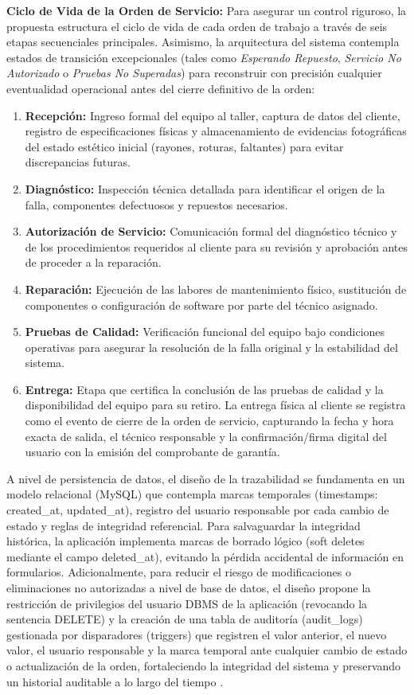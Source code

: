 \textbf{Ciclo de Vida de la Orden de Servicio:} Para asegurar un control riguroso, la propuesta estructura el ciclo de vida de cada orden de trabajo a través de seis etapas secuenciales principales. Asimismo, la arquitectura del sistema contempla estados de transición excepcionales (tales como \textit{Esperando Repuesto}, \textit{Servicio No Autorizado} o \textit{Pruebas No Superadas}) para reconstruir con precisión cualquier eventualidad operacional antes del cierre definitivo de la orden:

\begin{enumerate}
    \item \textbf{Recepción:} Ingreso formal del equipo al taller, captura de datos del cliente, registro de especificaciones físicas y almacenamiento de evidencias fotográficas del estado estético inicial (rayones, roturas, faltantes) para evitar discrepancias futuras.
    \item \textbf{Diagnóstico:} Inspección técnica detallada para identificar el origen de la falla, componentes defectuosos y repuestos necesarios.
    \item \textbf{Autorización de Servicio:} Comunicación formal del diagnóstico técnico y de los procedimientos requeridos al cliente para su revisión y aprobación antes de proceder a la reparación.
    \item \textbf{Reparación:} Ejecución de las labores de mantenimiento físico, sustitución de componentes o configuración de software por parte del técnico asignado.
    \item \textbf{Pruebas de Calidad:} Verificación funcional del equipo bajo condiciones operativas para asegurar la resolución de la falla original y la estabilidad del sistema.
    \item \textbf{Entrega:} Etapa que certifica la conclusión de las pruebas de calidad y la disponibilidad del equipo para su retiro. La entrega física al cliente se registra como el evento de cierre de la orden de servicio, capturando la fecha y hora exacta de salida, el técnico responsable y la confirmación/firma digital del usuario con la emisión del comprobante de garantía.
\end{enumerate}

A nivel de persistencia de datos, el diseño de la trazabilidad se fundamenta en un modelo relacional (MySQL) que contempla marcas temporales (timestamps: created\_at, updated\_at), registro del usuario responsable por cada cambio de estado y reglas de integridad referencial. Para salvaguardar la integridad histórica, la aplicación implementa marcas de borrado lógico (soft deletes mediante el campo deleted\_at), evitando la pérdida accidental de información en formularios. Adicionalmente, para reducir el riesgo de modificaciones o eliminaciones no autorizadas a nivel de base de datos, el diseño propone la restricción de privilegios del usuario DBMS de la aplicación (revocando la sentencia DELETE) y la creación de una tabla de auditoría (audit\_logs) gestionada por disparadores (triggers) que registren el valor anterior, el nuevo valor, el usuario responsable y la marca temporal ante cualquier cambio de estado o actualización de la orden, fortaleciendo la integridad del sistema y preservando un historial auditable a lo largo del tiempo \cite{moe1998, olsen2002}.

